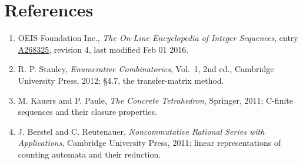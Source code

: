 \documentclass[11pt]{article}
\theoremstyle{definition}
\begin{document}
\section{References}

\begin{enumerate}

\item OEIS Foundation Inc., \emph{The On-Line Encyclopedia of Integer Sequences}, entry \href{https://oeis.org/A268325}{A268325}, revision 4, last modified Feb 01 2016.

\item R. P. Stanley, \emph{Enumerative Combinatorics}, Vol.~1, 2nd ed., Cambridge University Press, 2012; \S4.7, the transfer-matrix method.

\item M. Kauers and P. Paule, \emph{The Concrete Tetrahedron}, Springer, 2011; C-finite sequences and their closure properties.

\item J. Berstel and C. Reutenauer, \emph{Noncommutative Rational Series with Applications}, Cambridge University Press, 2011; linear representations of counting automata and their reduction.

\end{enumerate}
\end{document}
